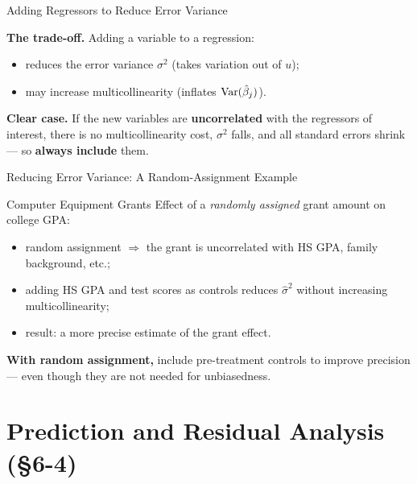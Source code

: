 \documentclass[aspectratio=169, 12pt]{beamer}
\begin{document}
\begin{frame}{Adding Regressors to Reduce Error Variance}

  \textbf{The trade-off.} Adding a variable to a regression:
  \begin{itemize}
    \item[\textcolor{positive}{$+$}] reduces the error variance $\sigma^2$ (takes
      variation out of $u$);
    \item[\textcolor{negative}{$-$}] may increase multicollinearity (inflates
      $\operatorname{Var}(\hat{\beta}_j)$).
  \end{itemize}

  \medskip

  \textbf{Clear case.} If the new variables are \textbf{uncorrelated} with the regressors
  of interest, there is no multicollinearity cost, $\sigma^2$ falls, and all standard
  errors shrink --- so \textbf{always include} them.

\end{frame}

\begin{frame}{Reducing Error Variance: A Random-Assignment Example}

  \begin{examplebox}{Computer Equipment Grants}
    Effect of a \emph{randomly assigned} grant amount on college GPA:
    \begin{itemize}
      \item random assignment $\Rightarrow$ the grant is uncorrelated with HS GPA,
        family background, etc.;
      \item adding HS GPA and test scores as controls reduces $\hat\sigma^2$ without
        increasing multicollinearity;
      \item result: a more precise estimate of the grant effect.
    \end{itemize}
  \end{examplebox}

  \medskip

  \begin{keybox}
    \textbf{With random assignment,} include pre-treatment controls to improve precision
    --- even though they are not needed for unbiasedness.
  \end{keybox}

\end{frame}

\section{Prediction and Residual Analysis (\S6-4)}
\end{document}
